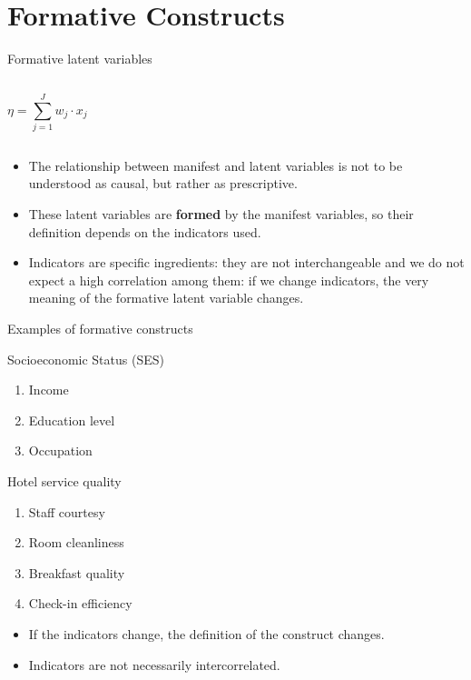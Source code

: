 \documentclass{beamer}
\begin{document}
\section{Formative Constructs}
\begin{frame}{Formative latent variables}
        \begin{columns}
    \[
    \eta = \sum_{j=1}^{J} w_{j} \cdot x_{j}
    \]
    \end{columns}
    \vspace{1em}
    \pause
    \small
    \begin{itemize}
        \item The relationship between manifest and latent variables is not to be understood as causal, but rather as prescriptive.
        \item These latent variables are \textbf{formed} by the manifest variables, so their definition depends on the indicators used.
        \item Indicators are specific ingredients: they are not interchangeable and we do not expect a high correlation among them: if we change indicators, the very meaning of the formative latent variable changes.
    \end{itemize}
\end{frame}

\begin{frame}{Examples of formative constructs}
\begin{block}{Socioeconomic Status (SES)}
    \begin{enumerate}
        \item Income
        \item Education level
        \item Occupation
    \end{enumerate}
\end{block}
\begin{block}{Hotel service quality}
    \begin{enumerate}
        \item Staff courtesy
        \item Room cleanliness
        \item Breakfast quality
        \item Check-in efficiency
    \end{enumerate}
\end{block}
\small
\begin{itemize}
    \item If the indicators change, the definition of the construct changes.
    \item Indicators are not necessarily intercorrelated.
\end{itemize}
\end{frame}
\end{document}
